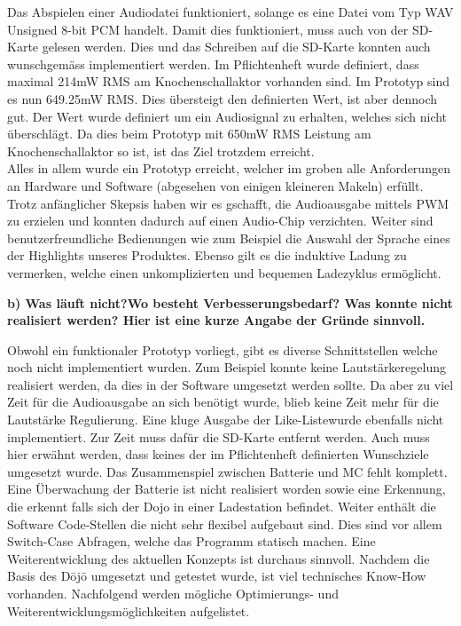 Das Abspielen einer Audiodatei funktioniert, solange es eine Datei vom Typ WAV Unsigned 8-bit PCM handelt. Damit dies funktioniert, muss auch von der SD-Karte gelesen werden. Dies und das Schreiben auf die SD-Karte konnten auch wunschgemäss implementiert werden. Im Pflichtenheft wurde definiert, dass maximal 214mW RMS am Knochenschallaktor vorhanden sind. Im Prototyp sind es nun 649.25mW RMS. Dies übersteigt den definierten Wert, ist aber dennoch gut. Der Wert wurde definiert um ein Audiosignal zu erhalten, welches sich nicht überschlägt. Da dies beim Prototyp mit 650mW RMS Leistung am Knochenschallaktor so ist, ist das Ziel trotzdem erreicht. \\
 
Alles in allem wurde ein Prototyp erreicht, welcher im groben alle Anforderungen an Hardware und Software (abgesehen von einigen kleineren Makeln) erfüllt. Trotz anfänglicher Skepsis haben wir es gschafft, die Audioausgabe mittels PWM zu erzielen und konnten dadurch auf einen Audio-Chip verzichten. Weiter sind benutzerfreundliche Bedienungen wie zum Beispiel die Auswahl der Sprache eines der Highlights unseres Produktes. Ebenso gilt es die induktive Ladung zu vermerken, welche einen unkomplizierten und bequemen Ladezyklus ermöglicht.

\textbf{b) Was läuft nicht?Wo besteht Verbesserungsbedarf? Was konnte nicht realisiert werden? Hier ist eine kurze Angabe der Gründe sinnvoll.}

Obwohl ein funktionaler Prototyp vorliegt, gibt es diverse Schnittstellen welche noch nicht implementiert wurden. Zum Beispiel konnte keine Lautstärkeregelung realisiert werden, da dies in der Software umgesetzt werden sollte. Da aber zu viel Zeit für die Audioausgabe an sich benötigt wurde, blieb keine Zeit mehr für die Lautstärke Regulierung. Eine kluge Ausgabe der \glqq Like-Liste\grqq wurde ebenfalls nicht implementiert. Zur Zeit muss dafür die SD-Karte entfernt werden. Auch muss hier erwähnt werden, dass keines der im Pflichtenheft definierten Wunschziele umgesetzt wurde.
Das Zusammenspiel zwischen Batterie und MC fehlt komplett. Eine Überwachung der Batterie ist nicht realisiert worden sowie eine Erkennung, die erkennt falls sich der Dojo in einer Ladestation befindet. Weiter enthält die Software Code-Stellen die nicht sehr flexibel aufgebaut sind. Dies sind vor allem Switch-Case Abfragen, welche das Programm statisch machen.
Eine Weiterentwicklung des aktuellen Konzepts ist durchaus sinnvoll. Nachdem die Basis des Dōjō umgesetzt und getestet wurde, ist viel technisches \glqq Know-How \grqq vorhanden. Nachfolgend werden mögliche Optimierungs- und Weiterentwicklungsmöglichkeiten aufgelistet. 
 
